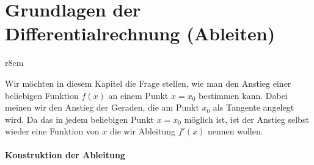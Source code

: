 \section{Grundlagen der Differentialrechnung (Ableiten)}

\begin{wrapfigure}{r}{8cm}
    \centering
    \vspace{-5mm}
    \vspace{-5mm}
\end{wrapfigure}

Wir möchten in diesem Kapitel die Frage stellen, wie man den Anstieg einer beliebigen Funktion $f(x)$ an einem Punkt $x=x_0$ bestimmen kann. Dabei meinen wir den Anstieg der Geraden, die am Punkt $x_0$ als Tangente angelegt wird. Da das in jedem beliebigen Punkt $x=x_0$ möglich ist, ist der Anstieg selbst wieder eine Funktion von $x$ die wir Ableitung $f'(x)$ nennen wollen.

\paragraph{Konstruktion der Ableitung}$~$


